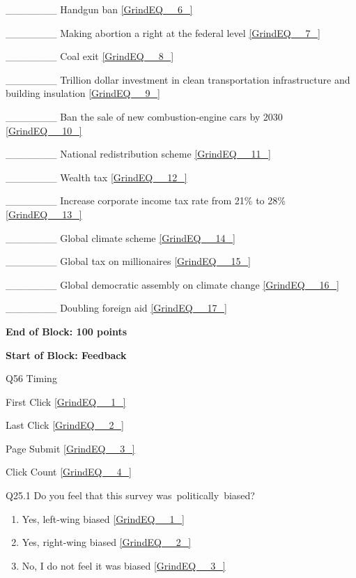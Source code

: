 \documentclass{article} %
\begin{document}
\noindent  \_\_\_\_\_\_\_ Handgun ban \eqref{GrindEQ__6_}

\noindent  \_\_\_\_\_\_\_ Making abortion a right at the federal level \eqref{GrindEQ__7_}

\noindent  \_\_\_\_\_\_\_ Coal exit \eqref{GrindEQ__8_}

\noindent  \_\_\_\_\_\_\_ Trillion dollar investment in clean transportation infrastructure and building insulation \eqref{GrindEQ__9_}

\noindent  \_\_\_\_\_\_\_ Ban the sale of new combustion-engine cars by 2030 \eqref{GrindEQ__10_}

\noindent  \_\_\_\_\_\_\_ National redistribution scheme \eqref{GrindEQ__11_}

\noindent  \_\_\_\_\_\_\_ Wealth tax \eqref{GrindEQ__12_}

\noindent  \_\_\_\_\_\_\_ Increase corporate income tax rate from 21\% to 28\% \eqref{GrindEQ__13_}

\noindent  \_\_\_\_\_\_\_ Global climate scheme \eqref{GrindEQ__14_}

\noindent  \_\_\_\_\_\_\_ Global tax on millionaires \eqref{GrindEQ__15_}

\noindent  \_\_\_\_\_\_\_ Global democratic assembly on climate change \eqref{GrindEQ__16_}

\noindent  \_\_\_\_\_\_\_ Doubling foreign aid \eqref{GrindEQ__17_}

\noindent 

\noindent \textbf{End of Block: 100 points}

\noindent \textbf{}

\noindent \textbf{Start of Block: Feedback}

\noindent 

\noindent Q56 Timing

\noindent First Click  \eqref{GrindEQ__1_}

\noindent Last Click  \eqref{GrindEQ__2_}

\noindent Page Submit  \eqref{GrindEQ__3_}

\noindent Click Count  \eqref{GrindEQ__4_}

\noindent 

\noindent 

\noindent 

\noindent Q25.1 Do you feel that this survey was~politically~biased?

\begin{enumerate}
\item  Yes, left-wing biased  \eqref{GrindEQ__1_} 

\item  Yes, right-wing biased  \eqref{GrindEQ__2_} 

\item  No, I do not feel it was biased  \eqref{GrindEQ__3_} 
\end{enumerate}
\end{document}
